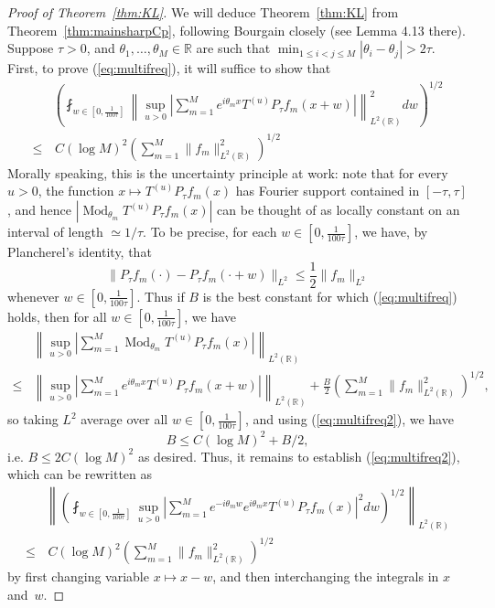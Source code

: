 \documentclass[12pt,leqno]{amsart}
\def\R{\mathbb{R}}
\def\beq{\begin{equation}}
\def\endeq{\end{equation}}
\DeclareMathOperator{\Mod}{Mod}
\theoremstyle{plain}
\numberwithin{equation}{section}
\begin{document}
\begin{proof}[Proof of Theorem~\ref{thm:KL}]
We will deduce Theorem~\ref{thm:KL} from Theorem~\ref{thm:mainsharpCp}, following  Bourgain \cite{MR1019960} closely (see Lemma 4.13 there). Suppose $\tau > 0$, and  $\theta_1, \dots, \theta_M \in \R$ are such that $\min_{1 \leq i < j \leq M} |\theta_i - \theta_j| > 2\tau$. First, to prove (\ref{eq:multifreq}), it will suffice to show that
\beq \label{eq:multifreq2}
\begin{split}
& \left( \fint_{w \in [0,\frac{1}{100\tau}]} \left \| \sup_{u > 0} \left | \sum_{m=1}^M e^{i \theta_m x} T^{(u)} P_{\tau} f_m (x + w) \right| \right \|_{L^2(\R)}^2  dw \right)^{1/2}  \\
\leq & \, C (\log M)^2 \left ( \sum_{m=1}^M \|f_m\|_{L^2(\R)}^2 \right )^{1/2}
\end{split}
\endeq
Morally speaking, this is the uncertainty principle at work: note that for every $u > 0$, the function $x \mapsto T^{(u)} P_{\tau} f_m(x)$ has Fourier support contained in $[-\tau,\tau]$, and hence $|\Mod_{\theta_m} T^{(u)} P_{\tau} f_m(x)|$ can be thought of as locally constant on an interval of length $\simeq 1/\tau$. To be precise, for each $w \in [0,\frac{1}{100\tau}]$, we have, by Plancherel's identity, that
$$
\|P_{\tau} f_m(\cdot) - P_{\tau} f_m(\cdot +w)\|_{L^2} \leq \frac{1}{2} \|f_m\|_{L^2}
$$
whenever $w \in [0, \frac{1}{100\tau}]$. Thus if $B$ is the best constant for which (\ref{eq:multifreq}) holds, then for all $w \in [0,\frac{1}{100\tau}]$, we have
\[
\begin{split}
& \left \| \sup_{u > 0} \left | \sum_{m=1}^M \Mod_{\theta_m} T^{(u)} P_{\tau} f_m(x) \right | \right \|_{L^2(\R)} \\
\leq & \left \| \sup_{u > 0} \left | \sum_{m=1}^M e^{i \theta_m x} T^{(u)} P_{\tau} f_m(x+w) \right | \right \|_{L^2(\R)} + \frac{B}{2}  \left ( \sum_{m=1}^M \|f_m\|_{L^2(\R)}^2 \right )^{1/2},
\end{split}
\]
so taking $L^2$ average over all $w \in [0,\frac{1}{100\tau}]$, and using (\ref{eq:multifreq2}), we have
$$
B \leq C (\log M)^2 + B/2,
$$
i.e. $B \leq 2 C (\log M)^2$ as desired. Thus, it remains to establish (\ref{eq:multifreq2}), which can be rewritten as
\beq \label{eq:multifreq3}
\begin{split}
& \left \| \left ( \fint_{w \in [0,\frac{1}{100\tau}]} \sup_{u > 0} \left | \sum_{m=1}^M e^{-i \theta_m w} e^{i \theta_m x} T^{(u)} P_{\tau} f_m (x) \right |^2 dw \right)^{1/2} \right \|_{L^2(\R)}  \\
\leq & \, C (\log M)^2 \left ( \sum_{m=1}^M \|f_m\|_{L^2(\R)}^2 \right )^{1/2}
\end{split}
\endeq
by first changing variable $x \mapsto x - w$, and then interchanging the integrals in $x$ and~$w$.


\end{proof}
\end{document}
